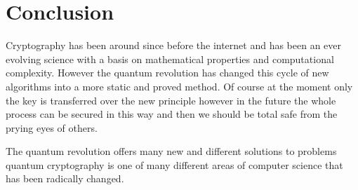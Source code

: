 \documentclass[12pt]{article}
\begin{document}
\section{Conclusion}
Cryptography has been around since before the internet and has been
an ever evolving science with a basis on mathematical properties and 
computational complexity. However the quantum revolution has changed this
cycle of new algorithms into a more static and proved method. Of course at the moment only the key is transferred over the new principle however in the future the whole process can be secured in this way and then we should be total safe from the prying eyes of others.

The quantum revolution offers many new and different solutions to problems quantum cryptography is one of many different areas of computer science that 
has been radically changed.
\end{document}
